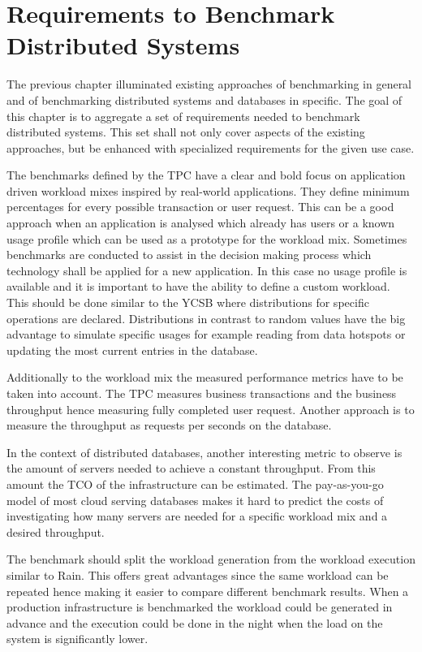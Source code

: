 
\chapter{Requirements to Benchmark Distributed Systems}
\label{cha:requirements}
The previous chapter illuminated existing approaches of benchmarking in general and of benchmarking distributed systems and databases in specific. The goal of this chapter is to aggregate a set of requirements needed to benchmark distributed systems. This set shall not only cover aspects of the existing approaches, but be enhanced with specialized requirements for the given use case.

The benchmarks defined by the \ac{TPC} have a clear and bold focus on application driven workload mixes inspired by real-world applications. They define minimum percentages for every possible transaction or user request. This can be a good approach when an application is analysed which already has users or a known usage profile which can be used as a prototype for the workload mix. Sometimes benchmarks are conducted to assist in the decision making process which technology shall be applied for a new application. In this case no usage profile is available and it is important to have the ability to define a custom workload. This should be done similar to the YCSB where distributions for specific operations are declared. Distributions in contrast to random values have the big advantage to simulate specific usages for example reading from data hotspots or updating the most current entries in the database.

Additionally to the workload mix the measured performance metrics have to be taken into account. The \ac{TPC} measures business transactions and the business throughput hence measuring fully completed user request. Another approach is to measure the throughput as requests per seconds on the database.

In the context of distributed databases, another interesting metric to observe is the amount of servers needed to achieve a constant throughput. From this amount the \ac{TCO} of the infrastructure can be estimated. The pay-as-you-go model of most cloud serving databases makes it hard to predict the costs of investigating how many servers are needed for a specific workload mix and a desired throughput.

The benchmark should split the workload generation from the workload execution similar to Rain. This offers great advantages since the same workload can be repeated hence making it easier to compare different benchmark results. When a production infrastructure is benchmarked the workload could be generated in advance and the execution could be done in the night when the load on the system is significantly lower.

